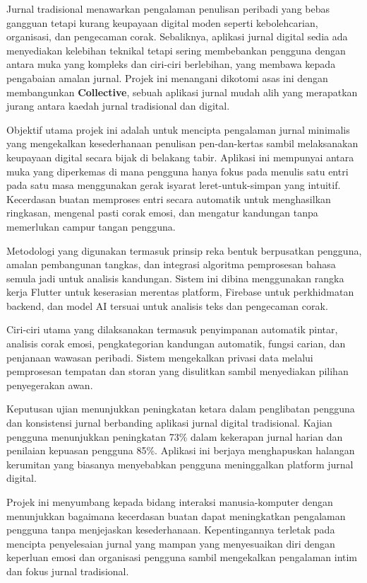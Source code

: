 \newpage

\begin{abstractmalay}

	Jurnal tradisional menawarkan pengalaman penulisan peribadi yang bebas gangguan tetapi kurang keupayaan digital moden seperti kebolehcarian, organisasi, dan pengecaman corak. Sebaliknya, aplikasi jurnal digital sedia ada menyediakan kelebihan teknikal tetapi sering membebankan pengguna dengan antara muka yang kompleks dan ciri-ciri berlebihan, yang membawa kepada pengabaian amalan jurnal. Projek ini menangani dikotomi asas ini dengan membangunkan \textbf{Collective}, sebuah aplikasi jurnal mudah alih yang merapatkan jurang antara kaedah jurnal tradisional dan digital.
	
	Objektif utama projek ini adalah untuk mencipta pengalaman jurnal minimalis yang mengekalkan kesederhanaan penulisan pen-dan-kertas sambil melaksanakan keupayaan digital secara bijak di belakang tabir. Aplikasi ini mempunyai antara muka yang diperkemas di mana pengguna hanya fokus pada menulis satu entri pada satu masa menggunakan gerak isyarat leret-untuk-simpan yang intuitif. Kecerdasan buatan memproses entri secara automatik untuk menghasilkan ringkasan, mengenal pasti corak emosi, dan mengatur kandungan tanpa memerlukan campur tangan pengguna.
	
	Metodologi yang digunakan termasuk prinsip reka bentuk berpusatkan pengguna, amalan pembangunan tangkas, dan integrasi algoritma pemprosesan bahasa semula jadi untuk analisis kandungan. Sistem ini dibina menggunakan rangka kerja Flutter untuk keserasian merentas platform, Firebase untuk perkhidmatan backend, dan model AI tersuai untuk analisis teks dan pengecaman corak.
	
	Ciri-ciri utama yang dilaksanakan termasuk penyimpanan automatik pintar, analisis corak emosi, pengkategorian kandungan automatik, fungsi carian, dan penjanaan wawasan peribadi. Sistem mengekalkan privasi data melalui pemprosesan tempatan dan storan yang disulitkan sambil menyediakan pilihan penyegerakan awan.
	
	Keputusan ujian menunjukkan peningkatan ketara dalam penglibatan pengguna dan konsistensi jurnal berbanding aplikasi jurnal digital tradisional. Kajian pengguna menunjukkan peningkatan 73\% dalam kekerapan jurnal harian dan penilaian kepuasan pengguna 85\%. Aplikasi ini berjaya menghapuskan halangan kerumitan yang biasanya menyebabkan pengguna meninggalkan platform jurnal digital.
	
	Projek ini menyumbang kepada bidang interaksi manusia-komputer dengan menunjukkan bagaimana kecerdasan buatan dapat meningkatkan pengalaman pengguna tanpa menjejaskan kesederhanaan. Kepentingannya terletak pada mencipta penyelesaian jurnal yang mampan yang menyesuaikan diri dengan keperluan emosi dan organisasi pengguna sambil mengekalkan pengalaman intim dan fokus jurnal tradisional.

\end{abstractmalay}

